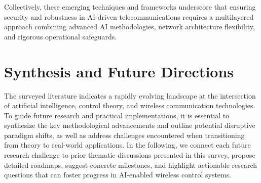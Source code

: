 \documentclass[sigconf]{acmart}
\begin{document}
Collectively, these emerging techniques and frameworks underscore that ensuring security and robustness in AI-driven telecommunications requires a multilayered approach combining advanced AI methodologies, network architecture flexibility, and rigorous operational safeguards.

\section{Synthesis and Future Directions}

The surveyed literature indicates a rapidly evolving landscape at the intersection of artificial intelligence, control theory, and wireless communication technologies. To guide future research and practical implementations, it is essential to synthesize the key methodological advancements and outline potential disruptive paradigm shifts, as well as address challenges encountered when transitioning from theory to real-world applications. In the following, we connect each future research challenge to prior thematic discussions presented in this survey, propose detailed roadmaps, suggest concrete milestones, and highlight actionable research questions that can foster progress in AI-enabled wireless control systems.
\end{document}
